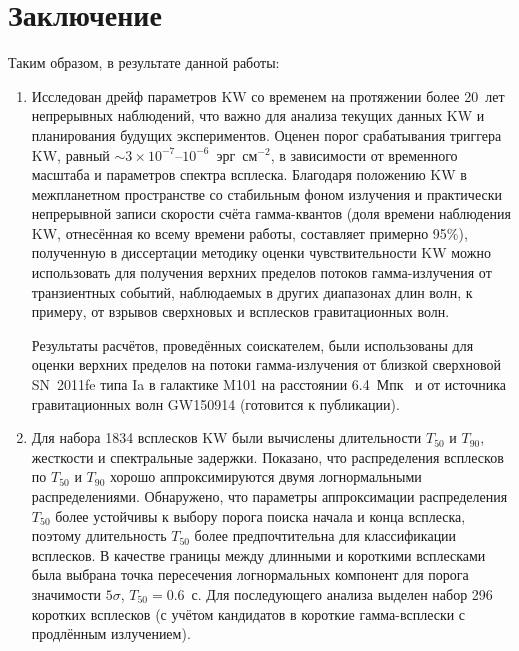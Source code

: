 \chapter*{Заключение}						%

Таким образом, в результате данной работы:
\begin{enumerate}
 
\item Исследован дрейф параметров KW со временем на протяжении более 20~лет непрерывных наблюдений,
    что важно для анализа текущих данных KW и планирования будущих экспериментов.
    Оценен порог срабатывания триггера KW, равный $\sim 3\times10^{-7}$--$10^{-6}$~эрг~см$^{-2}$,
    в зависимости от временного масштаба и параметров спектра всплеска. 
    Благодаря положению KW в межпланетном пространстве со стабильным 
    фоном излучения и практически непрерывной записи скорости счёта гамма-квантов 
    (доля времени наблюдения KW, отнесённая ко всему времени работы, составляет 
    примерно 95\%), полученную в диссертации методику оценки чувствительности KW
    можно использовать для получения верхних пределов потоков гамма-излучения  
    от транзиентных событий, наблюдаемых в других диапазонах длин волн, к примеру, 
    от взрывов сверхновых и всплесков гравитационных волн.
    
    Результаты расчётов, проведённых соискателем, были использованы для оценки верхних 
    пределов на потоки гамма-излучения от близкой сверхновой SN~2011fe типа Ia в 
    галактике M101 на расстоянии 6.4~Мпк~\citep{Margutti_2012ApJ} и от источника гравитационных
    волн GW150914 (готовится к публикации).
    
\item Для набора 1834 всплесков KW были вычислены длительности $T_{50}$ и $T_{90}$, жесткости 
    и спектральные задержки. Показано, что распределения 
    всплесков по $T_{50}$ и $T_{90}$ хорошо аппроксимируются двумя логнормальными 
    распределениями. Обнаружено, что параметры аппроксимации распределения $T_{50}$ 
    более устойчивы к выбору порога поиска начала и конца всплеска, поэтому длительность 
    $T_{50}$ более предпочтительна для классификации всплесков. В качестве границы между 
    длинными и короткими всплесками была выбрана точка пересечения логнормальных компонент 
    для порога значимости $5\sigma$, $T_{50} = 0.6$~с. 
    Для последующего анализа выделен набор 296 коротких всплесков (с учётом кандидатов 
    в короткие гамма-всплески с продлённым излучением). 
      

\end{enumerate}
